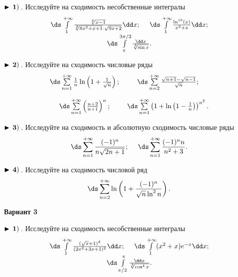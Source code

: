 $\bf\blacktriangleright\,1)\,$. Исследуйте на сходимость несобственные интегралы
\begin{equation*}
\begin{array}{cc}
  \,
\ds\int\limits_{1}^{+\infty} \frac{\sqrt[6]{x-1}}{\sqrt[3]{8x^2+x+1}\cdot \sqrt{9x+2}}\dd x

  ;\quad\,    \,
\ds\int\limits_{1}^{+\infty} \frac{\ln^{10}(x)}{x^2+x}\dd x

  ;\\
  \,
\ds\int\limits_{\pi}^{3\pi/2}\frac{\dd x}{\sqrt[3]{\sin x}}

  .
\end{array}
\end{equation*}


$\bf\blacktriangleright\,2)\,$. Исследуйте на сходимость числовые ряды
\begin{equation*}
    \begin{array}{ccc}
        \,
\ds\sum\limits_{n=1}^{+\infty}\frac{1}{n}\ln\left(1+\frac{1}{\sqrt{n}}\right)

        ; &   \,
\ds\sum\limits_{n=2}^{+\infty}\frac{\sqrt{n+1}-\sqrt{n-1}}{\sqrt{n}}

        ; \\[6mm]
        \,
\ds\sum\limits_{n=1}^{+\infty}\left(\frac{n+2}{n+1}\right)^{n}

        ; &    \,
\ds\sum\limits_{n=1}^{+\infty}\left(1+\ln\left(1-\frac{1}{n}\right)\right)^{n^2}

        .
    \end{array}
\end{equation*}


$\bf\blacktriangleright\,3)\,$. Исследуйте на сходимость и абсолютную сходимость числовые ряды
\begin{equation*}
    \,
\ds\sum\limits_{n=1}^{+\infty}\frac{(-1)^n}{n\sqrt{2n+1}}

    ;\quad\,   \,
\ds\sum\limits_{n=1}^{+\infty}\frac{(-1)^n n}{n^2+3}
    .
\end{equation*}


$\bf\blacktriangleright\,4)\,$. Исследуйте на сходимость числовой ряд
\begin{equation*}
    \,
\ds\sum\limits_{n=2}^{+\infty}\ln\left(1+\frac{(-1)^n}{\sqrt{n}\ln^2 n}\right)

    .
\end{equation*}

\centerline{\bf\Large Вариант 3}


$\bf\blacktriangleright\,1)\,$. Исследуйте на сходимость несобственные интегралы
\begin{equation*}
\begin{array}{cc}
  \,
\ds\int\limits_{1}^{+\infty} \frac{(\sqrt{x}+1)^4}{(2x^2+3x+1)^2}\dd x

  ;\quad\,    \,
\ds\int\limits_{1}^{+\infty} (x^2+x)e^{-x}\dd x

  ;\\
  \,
\ds\int\limits_{\pi/2}^{\pi}\frac{\dd x}{\sqrt[3]{\cos^4 x}}

  .
\end{array}
\end{equation*}


